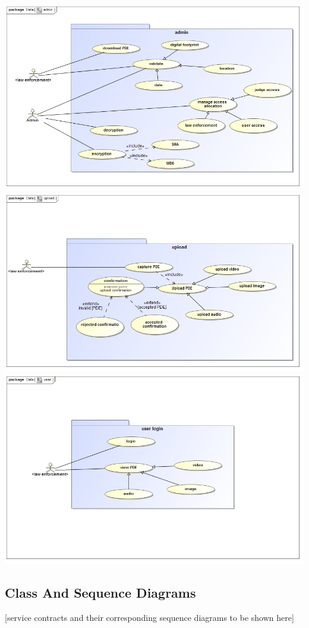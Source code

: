 \documentclass[a4paper,12pt]{article}
\begin{document}
\includegraphics[width=1.0\textwidth]{images/admin.jpg}
\includegraphics[width=1.0\textwidth]{images/upload.jpg}
\includegraphics[width=1.0\textwidth]{images/user.jpg}

\subsection{Class And Sequence Diagrams}
[service contracts and their corresponding sequence diagrams to be shown here]
\end{document}
